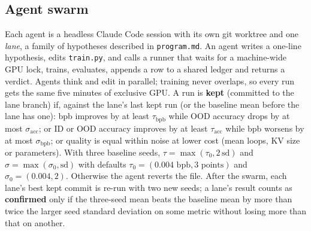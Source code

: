 \subsection{Agent swarm}\label{sec:swarm-def}
Each agent is a headless Claude Code session with its own git worktree and one \emph{lane}, a family of
hypotheses described in \texttt{program.md}. An agent writes a one-line hypothesis, edits
\texttt{train.py}, and calls a runner that waits for a machine-wide GPU lock, trains, evaluates, appends a
row to a shared ledger and returns a verdict. Agents think and edit in parallel; training never
overlaps, so every run gets the same five minutes of exclusive GPU. A run is \textbf{kept} (committed to
the lane branch) if, against the lane's last kept run (or the baseline mean before the lane has one):
bpb improves by at least $\tau_{\text{bpb}}$ while OOD accuracy drops by at most $\sigma_{\text{acc}}$;
or ID or OOD accuracy improves by at least $\tau_{\text{acc}}$ while bpb worsens by at most
$\sigma_{\text{bpb}}$; or quality is equal within noise at lower cost (mean loops, KV size or
parameters). With three baseline seeds, $\tau=\max(\tau_0, 2\,\mathrm{sd})$ and
$\sigma=\max(\sigma_0,\mathrm{sd})$ with defaults $\tau_0=(0.004\text{ bpb}, 3\text{ points})$ and
$\sigma_0=(0.004, 2)$. Otherwise the agent reverts the file. After the swarm, each lane's best kept
commit is re-run with two new seeds; a lane's result counts as \textbf{confirmed} only if the three-seed
mean beats the baseline mean by more than twice the larger seed standard deviation on some metric
without losing more than that on another.
